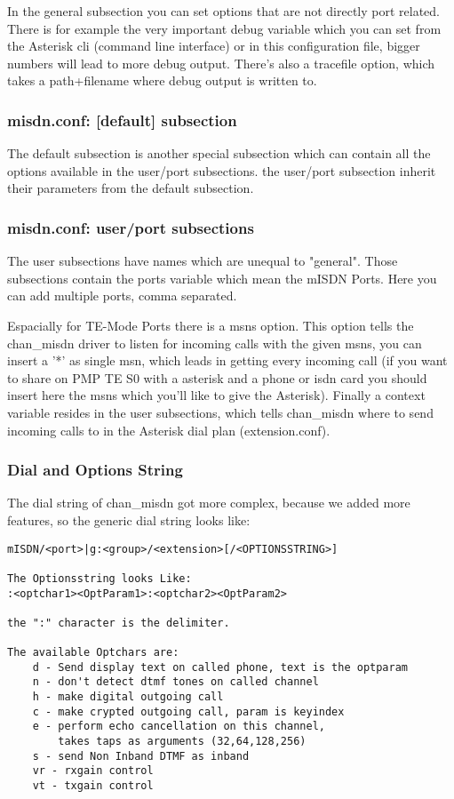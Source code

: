In the general subsection you can set options that are not directly port
related. There is for example the very important debug variable which you can
set from the Asterisk cli (command line interface) or in this configuration
file, bigger numbers will lead to more debug output. There's also a tracefile
option, which takes a path+filename where debug output is written to.

\subsubsection{misdn.conf: [default] subsection}

The default subsection is another special subsection which can contain all the
options available in the user/port subsections. the user/port subsection inherit
their parameters from the default subsection.

\subsubsection{misdn.conf: user/port subsections}

The user subsections have names which are unequal to "general". Those subsections
contain the ports variable which mean the mISDN Ports. Here you can add
multiple ports, comma separated.

Espacially for TE-Mode Ports there is a msns option. This option tells the
chan\_misdn driver to listen for incoming calls with the given msns, you can
insert a '*' as single msn, which leads in getting every incoming call (if you
want to share on PMP TE S0 with a asterisk and a phone or isdn card you should
insert here the msns which you'll like to give the Asterisk).  Finally a
context variable resides in the user subsections, which tells chan\_misdn where to
send incoming calls to in the Asterisk dial plan (extension.conf).


\subsubsection{Dial and Options String}

The dial string of chan\_misdn got more complex, because we added more features,
so the generic dial string looks like:

\begin{verbatim}
mISDN/<port>|g:<group>/<extension>[/<OPTIONSSTRING>]

The Optionsstring looks Like:
:<optchar1><OptParam1>:<optchar2><OptParam2>

the ":" character is the delimiter.

The available Optchars are: 
	d - Send display text on called phone, text is the optparam
	n - don't detect dtmf tones on called channel
	h - make digital outgoing call
	c - make crypted outgoing call, param is keyindex
	e - perform echo cancellation on this channel, 
	    takes taps as arguments (32,64,128,256)
	s - send Non Inband DTMF as inband
	vr - rxgain control
	vt - txgain control
\end{verbatim}

